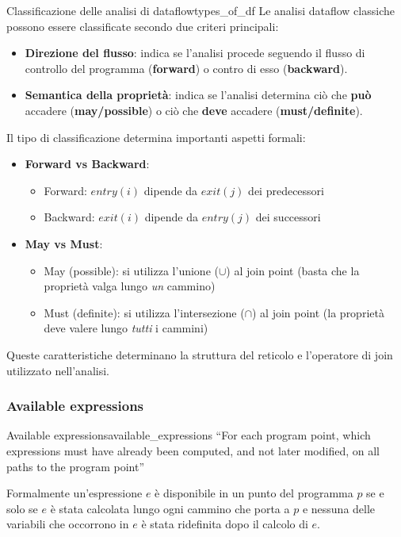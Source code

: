 \begin{nota}{Classificazione delle analisi di dataflow}{types_of_df}
Le analisi dataflow classiche possono essere classificate secondo due
criteri principali:
\begin{itemize}
    \item \textbf{Direzione del flusso}: indica se l'analisi procede
    seguendo il flusso di controllo del programma (\textbf{forward}) o
    contro di esso (\textbf{backward}).
    \item \textbf{Semantica della proprietà}: indica se l'analisi
    determina ciò che \textbf{può} accadere (\textbf{may/possible}) o ciò che
    \textbf{deve} accadere (\textbf{must/definite}).
\end{itemize}

Il tipo di classificazione determina importanti aspetti formali:

\begin{itemize}
    \item \textbf{Forward vs Backward}:
    \begin{itemize}
        \item Forward: $entry(i)$ dipende da $exit(j)$ dei predecessori
        \item Backward: $exit(i)$ dipende da $entry(j)$ dei successori
    \end{itemize}
    
    \item \textbf{May vs Must}:
    \begin{itemize}
        \item May (possible): si utilizza l'unione ($\cup$) al join point
        (basta che la proprietà valga lungo \emph{un} cammino)
        \item Must (definite): si utilizza l'intersezione ($\cap$) al join point
        (la proprietà deve valere lungo \emph{tutti} i cammini)
    \end{itemize}
\end{itemize}

Queste caratteristiche determinano la struttura del reticolo e l'operatore
di join utilizzato nell'analisi.

\end{nota}

\subsubsection{Available expressions}

\begin{definizione}{Available expressions}{available_expressions}
``For each program point, which expressions must have already
been computed, and not later modified, on all paths to the program
point''

Formalmente un'espressione $e$ è disponibile in un punto del programma $p$ se
e solo se $e$ è stata calcolata lungo ogni cammino che porta a $p$ e nessuna
delle variabili che occorrono in $e$ è stata ridefinita dopo il calcolo di $e$.
\end{definizione}

